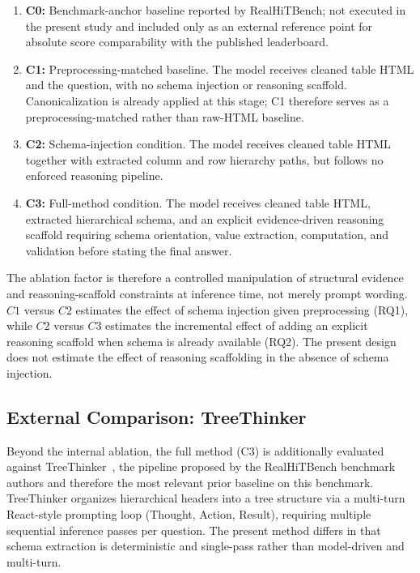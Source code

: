 ﻿\documentclass[a4paper]{article}
\begin{document}
\begin{enumerate}
    \item \textbf{C0:} Benchmark-anchor baseline reported by 
    RealHiTBench; not executed in the present study and included 
    only as an external reference point for absolute score 
    comparability with the published leaderboard.

    \item \textbf{C1:} Preprocessing-matched baseline. The model 
    receives cleaned table HTML and the question, with no schema 
    injection or reasoning scaffold. Canonicalization is already 
    applied at this stage; C1 therefore serves as a 
    preprocessing-matched rather than raw-HTML baseline.

    \item \textbf{C2:} Schema-injection condition. The model receives 
    cleaned table HTML together with extracted column and row 
    hierarchy paths, but follows no enforced reasoning pipeline.

    \item \textbf{C3:} Full-method condition. The model receives 
    cleaned table HTML, extracted hierarchical schema, and an 
    explicit evidence-driven reasoning scaffold requiring schema 
    orientation, value extraction, computation, and validation 
    before stating the final answer.
\end{enumerate}

The ablation factor is therefore a controlled manipulation of 
structural evidence and reasoning-scaffold constraints at inference 
time, not merely prompt wording. \(C1\) versus \(C2\) estimates the 
effect of schema injection given preprocessing (RQ1), while \(C2\) 
versus \(C3\) estimates the incremental effect of adding an explicit 
reasoning scaffold when schema is already available (RQ2). The 
present design does not estimate the effect of reasoning scaffolding 
in the absence of schema injection.

\subsection{External Comparison: TreeThinker}

Beyond the internal ablation, the full method (C3) is additionally 
evaluated against TreeThinker~\cite{wu2025realhitbench}, the 
pipeline proposed by the RealHiTBench benchmark authors and 
therefore the most relevant prior baseline on this benchmark. 
TreeThinker organizes hierarchical headers into a tree structure 
via a multi-turn React-style prompting loop (Thought, Action, 
Result), requiring multiple sequential inference passes per 
question. The present method differs in that schema extraction is 
deterministic and single-pass rather than model-driven and 
multi-turn.
\end{document}
